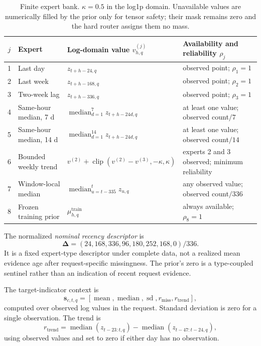 \documentclass[10pt,conference,letterpaper]{IEEEtran}
\begin{document}
\begin{table}[t]
\centering
\caption{Finite expert bank. $\kappa=0.5$ in the log1p domain. Unavailable values are numerically filled by the prior only for tensor safety; their mask remains zero and the hard router assigns them no mass.}
\label{tab:experts}
\footnotesize
\setlength{\tabcolsep}{4.0pt}
\begin{tabular}{c>{\raggedright\arraybackslash}p{}>{\raggedright\arraybackslash}p{}>{\raggedright\arraybackslash}p{}}
\toprule
$j$ & Expert & Log-domain value $v^{(j)}_{h,q}$ & Availability and reliability $\rho_j$\\
\midrule
1 & Last day & $z_{t+h-24,q}$ & observed point; $\rho_1=1$\\
2 & Last week & $z_{t+h-168,q}$ & observed point; $\rho_2=1$\\
3 & Two-week lag & $z_{t+h-336,q}$ & observed point; $\rho_3=1$\\
4 & Same-hour median, 7 d & $\operatorname{median}_{d=1}^{7}z_{t+h-24d,q}$ & at least one value; observed count$/7$\\
5 & Same-hour median, 14 d & $\operatorname{median}_{d=1}^{14}z_{t+h-24d,q}$ & at least one value; observed count$/14$\\
6 & Bounded weekly trend & $v^{(2)}+\operatorname{clip}(v^{(2)}-v^{(3)},-\kappa,\kappa)$ & experts 2 and 3 observed; minimum reliability\\
7 & Window-local median & $\operatorname{median}_{u=t-335}^{t}z_{u,q}$ & any observed value; observed count$/336$\\
8 & Frozen training prior & $\mu^{\mathrm{train}}_{h,q}$ & always available; $\rho_8=1$\\
\bottomrule
\end{tabular}
\end{table}

The normalized \emph{nominal recency descriptor} is
\begin{equation}
\boldsymbol\Delta=(24,168,336,96,180,252,168,0)/336.
\end{equation}
It is a fixed expert-type descriptor under complete data, not a realized mean evidence age after request-specific missingness. The prior's zero is a type-coupled sentinel rather than an indication of recent request evidence.

The target-indicator context is
\begin{equation}
\mathbf s_{c,t,q}=[\operatorname{mean},\operatorname{median},\operatorname{sd},
r_{\mathrm{miss}},r_{\mathrm{trend}}],
\end{equation}
computed over observed log values in the request. Standard deviation is zero for a single observation. The trend is
\begin{equation}
r_{\mathrm{trend}}=
\operatorname{median}(z_{t-23:t,q})-
\operatorname{median}(z_{t-47:t-24,q}),
\end{equation}
using observed values and set to zero if either day has no observation.
\end{document}
